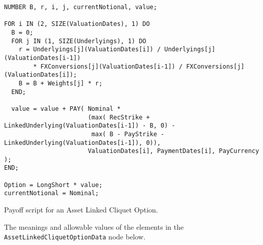 \begin{listing}[hbt] 
\begin{verbatim} 
NUMBER B, r, i, j, currentNotional, value;

FOR i IN (2, SIZE(ValuationDates), 1) DO
  B = 0;
  FOR j IN (1, SIZE(Underlyings), 1) DO
    r = Underlyings[j](ValuationDates[i]) / Underlyings[j](ValuationDates[i-1])
        * FXConversions[j](ValuationDates[i-1]) / FXConversions[j](ValuationDates[i]);
    B = B + Weights[j] * r;
  END;

  value = value + PAY( Nominal * 
                       (max( RecStrike + LinkedUnderlying(ValuationDates[i-1]) - B, 0) -
                        max( B - PayStrike - LinkedUnderlying(ValuationDates[i-1]), 0)),
                       ValuationDates[i], PaymentDates[i], PayCurrency );
END;

Option = LongShort * value;
currentNotional = Nominal;
\end{verbatim} 
\caption{Payoff script for an Asset Linked Cliquet Option.} 
\label{lst:asset_linked_cliquet_option} 
\end{listing} 
 
The meanings and allowable values of the elements in the \lstinline!AssetLinkedCliquetOptionData!
node below. 
 
